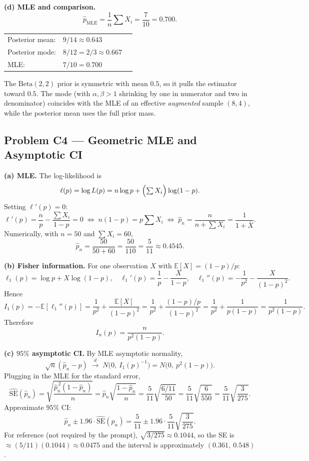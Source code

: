 \documentclass[11pt]{article}
\begin{document}
\textbf{(d) MLE and comparison.}
\[
\widehat{p}_{\text{MLE}} = \frac{1}{n}\sum X_i = \frac{7}{10} = \boxed{0.700.}
\]

\begin{tabular}{lll}
Posterior mean: & $9/14 \approx 0.643$ \\
Posterior mode: & $8/12 = 2/3 \approx 0.667$ \\
MLE: & $7/10 = 0.700$
\end{tabular}

The $\text{Beta}(2,2)$ prior is symmetric with mean $0.5$, so it pulls the estimator toward $0.5$. The mode (with $\alpha,\beta>1$ shrinking by one in numerator and two in denominator) coincides with the MLE of an effective \emph{augmented} sample $(8, 4)$, while the posterior mean uses the full prior mass.

\subsection*{Problem C4 --- Geometric MLE and Asymptotic CI}

\textbf{(a) MLE.} The log-likelihood is
\[
\ell(p) = \log L(p) = n \log p + \Bigl(\textstyle\sum X_i\Bigr)\log(1-p).
\]
Setting $\ell'(p) = 0$:
\[
\ell'(p) = \frac{n}{p} - \frac{\sum X_i}{1-p} = 0
\;\Longleftrightarrow\;
n(1-p) = p\textstyle\sum X_i
\;\Longleftrightarrow\;
\widehat{p}_n = \frac{n}{n + \sum X_i} = \frac{1}{1 + \bar{X}}.
\]
Numerically, with $n=50$ and $\sum X_i = 60$,
\[
\boxed{\widehat{p}_n = \frac{50}{50 + 60} = \frac{50}{110} = \frac{5}{11} \approx 0.4545.}
\]

\textbf{(b) Fisher information.} For one observation $X$ with $\mathbb{E}[X] = (1-p)/p$:
\[
\ell_1(p) = \log p + X\log(1-p),
\quad
\ell_1'(p) = \frac{1}{p} - \frac{X}{1-p},
\quad
\ell_1''(p) = -\frac{1}{p^2} - \frac{X}{(1-p)^2}.
\]
Hence
\[
I_1(p) = -\mathbb{E}[\ell_1''(p)] = \frac{1}{p^2} + \frac{\mathbb{E}[X]}{(1-p)^2}
= \frac{1}{p^2} + \frac{(1-p)/p}{(1-p)^2}
= \frac{1}{p^2} + \frac{1}{p(1-p)}
= \frac{1}{p^2(1-p)}.
\]
Therefore
\[
\boxed{I_n(p) = \frac{n}{p^2(1-p)}.}
\]

\textbf{(c) $95\%$ asymptotic CI.} By MLE asymptotic normality,
\[
\sqrt{n}(\widehat{p}_n - p) \;\xrightarrow{d}\; N\!\bigl(0,\ I_1(p)^{-1}\bigr) = N\!\bigl(0,\ p^2(1-p)\bigr).
\]
Plugging in the MLE for the standard error,
\[
\widehat{\text{SE}}(\widehat{p}_n) = \sqrt{\frac{\widehat{p}_n^{\,2}(1-\widehat{p}_n)}{n}}
= \widehat{p}_n \sqrt{\frac{1-\widehat{p}_n}{n}}
= \frac{5}{11}\sqrt{\frac{6/11}{50}}
= \frac{5}{11}\sqrt{\frac{6}{550}}
= \frac{5}{11}\sqrt{\frac{3}{275}}.
\]
Approximate $95\%$ CI:
\[
\boxed{\widehat{p}_n \pm 1.96 \cdot \widehat{\text{SE}}(\widehat{p}_n)
= \frac{5}{11} \pm 1.96 \cdot \frac{5}{11}\sqrt{\frac{3}{275}}.}
\]
For reference (not required by the prompt), $\sqrt{3/275} \approx 0.1044$, so the SE is $\approx (5/11)(0.1044) \approx 0.0475$ and the interval is approximately $(0.361,\ 0.548)$.
\end{document}
